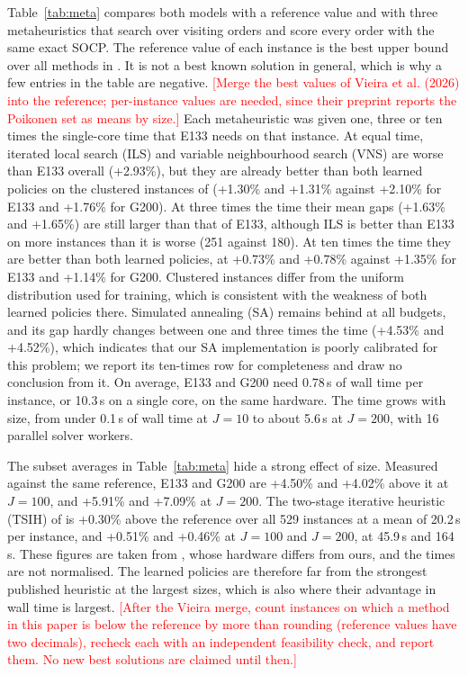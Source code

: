 \documentclass[preprint,12pt,authoryear]{elsarticle}
\newcommand{\placeholder}[1]{\textcolor{red}{[#1]}}
\begin{document}
Table~\ref{tab:meta} compares both models with a reference value and with three metaheuristics that search over visiting orders and score every order with the same exact SOCP. The reference value of each instance is the best upper bound over all methods in \citet{li2025}. It is not a best known solution in general, which is why a few entries in the table are negative. \placeholder{Merge the best values of Vieira et al. (2026) into the reference; per-instance values are needed, since their preprint reports the Poikonen set as means by size.} Each metaheuristic was given one, three or ten times the single-core time that E133 needs on that instance. At equal time, iterated local search (ILS) and variable neighbourhood search (VNS) are worse than E133 overall (+2.93\%), but they are already better than both learned policies on the clustered instances of \citet{poikonen2020} (+1.30\% and +1.31\% against +2.10\% for E133 and +1.76\% for G200). At three times the time their mean gaps (+1.63\% and +1.65\%) are still larger than that of E133, although ILS is better than E133 on more instances than it is worse (251 against 180). At ten times the time they are better than both learned policies, at +0.73\% and +0.78\% against +1.35\% for E133 and +1.14\% for G200. Clustered instances differ from the uniform distribution used for training, which is consistent with the weakness of both learned policies there. Simulated annealing (SA) remains behind at all budgets, and its gap hardly changes between one and three times the time (+4.53\% and +4.52\%), which indicates that our SA implementation is poorly calibrated for this problem; we report its ten-times row for completeness and draw no conclusion from it. On average, E133 and G200 need 0.78\,s of wall time per instance, or 10.3\,s on a single core, on the same hardware. The time grows with size, from under 0.1\,s of wall time at $J = 10$ to about 5.6\,s at $J = 200$, with 16 parallel solver workers.

The subset averages in Table~\ref{tab:meta} hide a strong effect of size. Measured against the same reference, E133 and G200 are +4.50\% and +4.02\% above it at $J = 100$, and +5.91\% and +7.09\% at $J = 200$. The two-stage iterative heuristic (TSIH) of \citet{li2025} is +0.30\% above the reference over all 529 instances at a mean of 20.2\,s per instance, and +0.51\% and +0.46\% at $J = 100$ and $J = 200$, at 45.9\,s and 164\,s. These figures are taken from \citet{li2025}, whose hardware differs from ours, and the times are not normalised. The learned policies are therefore far from the strongest published heuristic at the largest sizes, which is also where their advantage in wall time is largest. \placeholder{After the Vieira merge, count instances on which a method in this paper is below the reference by more than rounding (reference values have two decimals), recheck each with an independent feasibility check, and report them. No new best solutions are claimed until then.}
\end{document}

